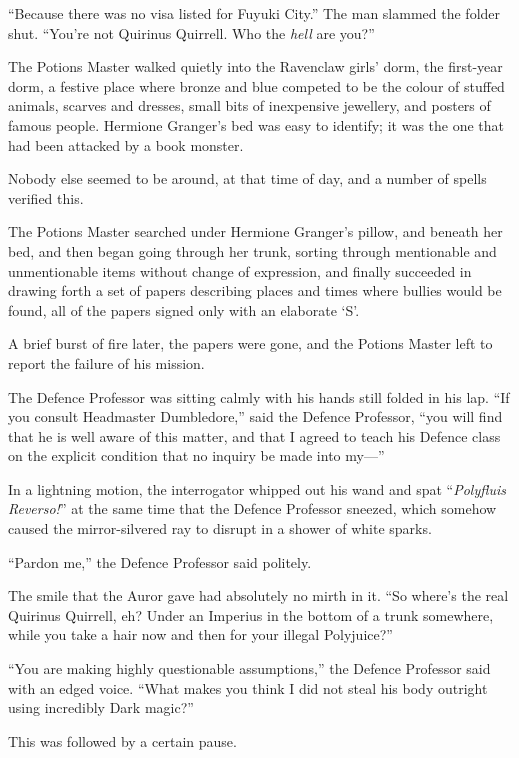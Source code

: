 “Because there was no visa listed for Fuyuki City.” The man slammed the folder shut. “You’re not Quirinus Quirrell. Who the \emph{hell} are you?”

\later

The Potions Master walked quietly into the Ravenclaw girls’ dorm, the first-year dorm, a festive place where bronze and blue competed to be the colour of stuffed animals, scarves and dresses, small bits of inexpensive jewellery, and posters of famous people. Hermione Granger’s bed was easy to identify; it was the one that had been attacked by a book monster.

Nobody else seemed to be around, at that time of day, and a number of spells verified this.

The Potions Master searched under Hermione Granger’s pillow, and beneath her bed, and then began going through her trunk, sorting through mentionable and unmentionable items without change of expression, and finally succeeded in drawing forth a set of papers describing places and times where bullies would be found, all of the papers signed only with an elaborate ‘S’.

A brief burst of fire later, the papers were gone, and the Potions Master left to report the failure of his mission.

\later

The Defence Professor was sitting calmly with his hands still folded in his lap. “If you consult Headmaster Dumbledore,” said the Defence Professor, “you will find that he is well aware of this matter, and that I agreed to teach his Defence class on the explicit condition that no inquiry be made into my—”

In a lightning motion, the interrogator whipped out his wand and spat “\emph{Polyfluis Reverso!}” at the same time that the Defence Professor sneezed, which somehow caused the mirror-silvered ray to disrupt in a shower of white sparks.

“Pardon me,” the Defence Professor said politely.

The smile that the Auror gave had absolutely no mirth in it. “So where’s the real Quirinus Quirrell, eh? Under an Imperius in the bottom of a trunk somewhere, while you take a hair now and then for your illegal Polyjuice?”

“You are making highly questionable assumptions,” the Defence Professor said with an edged voice. “What makes you think I did not steal his body outright using incredibly Dark magic?”

This was followed by a certain pause.

